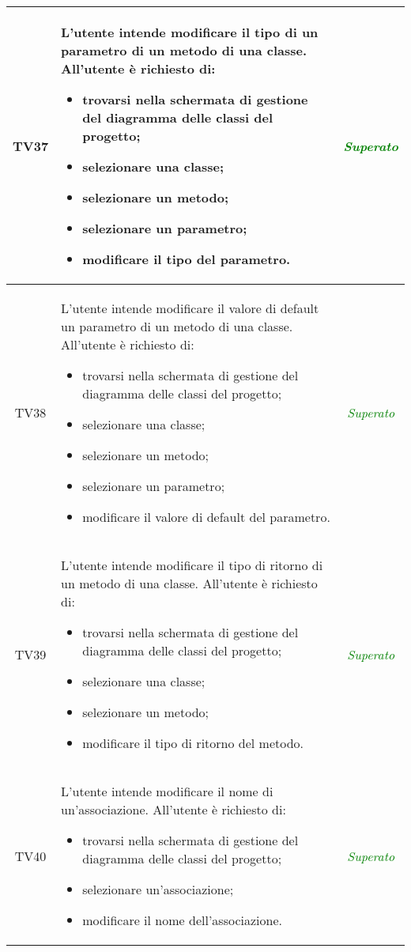 \begin{longtable}{|c|>{}m{8cm}|c|}
\hypertarget{TV3.11.4.3.2}{TV37} & L'utente intende modificare il tipo di un parametro di un metodo di una classe.
All'utente è richiesto di:
\begin{itemize}
	\item trovarsi nella schermata di gestione del diagramma delle classi del progetto;
	\item selezionare una classe; 
	\item selezionare un metodo;
	\item selezionare un parametro;
	\item modificare il tipo del parametro.
\end{itemize} & \textcolor{Green}{\textit{Superato}}\\ \hline

\hypertarget{TV3.11.4.3.3}{TV38} & L'utente intende modificare il valore di default un parametro di un metodo di una classe.
All'utente è richiesto di:
\begin{itemize}
	\item trovarsi nella schermata di gestione del diagramma delle classi del progetto;
	\item selezionare una classe; 
	\item selezionare un metodo;
	\item selezionare un parametro;
	\item modificare il valore di default del parametro.
\end{itemize} & \textcolor{Green}{\textit{Superato}}\\ \hline

\hypertarget{TV3.11.4.4}{TV39} & L'utente intende modificare il tipo di ritorno di un metodo di una classe.
All'utente è richiesto di:
\begin{itemize}
	\item trovarsi nella schermata di gestione del diagramma delle classi del progetto;
	\item selezionare una classe;
	\item selezionare un metodo;
	\item modificare il tipo di ritorno del metodo.
\end{itemize} & \textcolor{Green}{\textit{Superato}}\\ \hline

\hypertarget{TV3.12.2}{TV40} & L'utente intende modificare il nome di un'associazione.
All'utente è richiesto di:
\begin{itemize}
	\item trovarsi nella schermata di gestione del diagramma delle classi del progetto;
	\item selezionare un'associazione;
	\item modificare il nome dell'associazione.
\end{itemize} & \textcolor{Green}{\textit{Superato}}\\ \hline


\end{longtable}
